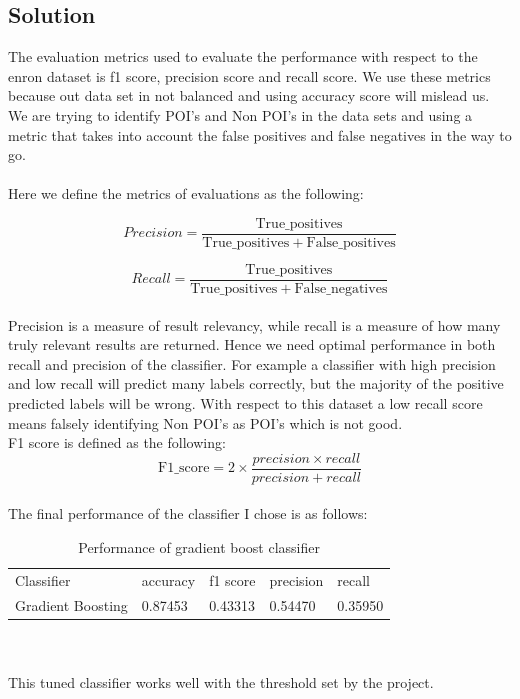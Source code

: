 \documentclass[12pt]{article}%
\begin{document}
\subsection*{Solution}

The evaluation metrics used to evaluate the performance with respect to the enron dataset is f1 score, precision score and recall score. We use these metrics because out data set in not balanced and using accuracy score will mislead us. We are trying to identify POI's and Non POI's in the data sets and using a metric that takes into account the false positives and false negatives in the way to go.
\\
\\
Here we define the metrics of evaluations as the following:

\begin{equation}
Precision = \frac{\mathrm{True\_positives}}{\mathrm{True\_positives} + \mathrm{False\_positives}}
\end{equation}

\begin{equation}
Recall = \frac{\mathrm{True\_positives}}{\mathrm{True\_positives} + \mathrm{False\_negatives}}
\end{equation}
\\
Precision is a measure of result relevancy, while recall is a measure of how many truly relevant results are returned. Hence we need optimal performance in both recall and precision of the classifier. For example a classifier with high precision and low recall will predict many labels correctly, but the majority of the positive predicted labels will be wrong. With respect to this dataset a low recall score means falsely identifying Non POI's as POI's which is not good.
\\
F1 score is defined as the following:
\begin{equation}
\mathrm{F1\_score} = 2 \times \frac{precision \times recall}{precision + recall}
\end{equation}
\\
The final performance of the classifier I chose is as follows:
\begin{table}[!htb]
\centering
\caption{Performance of gradient boost classifier}
\begin{tabular}{lllll}
 Classifier & accuracy & f1 score & precision & recall \\
 Gradient Boosting & 0.87453 &  0.43313 & 0.54470 & 0.35950 \\ 
\end{tabular}
\end{table}
\\
\\
This tuned classifier works well with the threshold set by the project.
\end{document}
